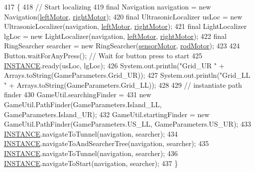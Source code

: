 \begin{DoxyCode}
417                                                   \{
418     \textcolor{comment}{// Start localizing}
419     \textcolor{keyword}{final} Navigation navigation = \textcolor{keyword}{new} Navigation(\hyperlink{enumca_1_1mcgill_1_1ecse211_1_1project_1_1_game_a7c673571bf50fdb6917a9d7bb671e003}{leftMotor}, \hyperlink{enumca_1_1mcgill_1_1ecse211_1_1project_1_1_game_a7a05fcf37c4435c32270776a427ba0d2}{rightMotor});
420     \textcolor{keyword}{final} UltrasonicLocalizer usLoc = \textcolor{keyword}{new} UltrasonicLocalizer(navigation, 
      \hyperlink{enumca_1_1mcgill_1_1ecse211_1_1project_1_1_game_a7c673571bf50fdb6917a9d7bb671e003}{leftMotor}, \hyperlink{enumca_1_1mcgill_1_1ecse211_1_1project_1_1_game_a7a05fcf37c4435c32270776a427ba0d2}{rightMotor});
421     \textcolor{keyword}{final} LightLocalizer lgLoc = \textcolor{keyword}{new} LightLocalizer(navigation, \hyperlink{enumca_1_1mcgill_1_1ecse211_1_1project_1_1_game_a7c673571bf50fdb6917a9d7bb671e003}{leftMotor}, 
      \hyperlink{enumca_1_1mcgill_1_1ecse211_1_1project_1_1_game_a7a05fcf37c4435c32270776a427ba0d2}{rightMotor});
422     \textcolor{keyword}{final} RingSearcher searcher = \textcolor{keyword}{new} RingSearcher(\hyperlink{enumca_1_1mcgill_1_1ecse211_1_1project_1_1_game_aa94b85dc88de85d959677bd6c0f98989}{sensorMotor}, 
      \hyperlink{enumca_1_1mcgill_1_1ecse211_1_1project_1_1_game_abc070af2fa5a5cda6d81977b35aacfb4}{rodMotor});
423 
424     Button.waitForAnyPress(); \textcolor{comment}{// Wait for button press to start}
425     \hyperlink{enumca_1_1mcgill_1_1ecse211_1_1project_1_1_game_a6584b6534b14ba43dc1444084a925a20}{INSTANCE}.ready(usLoc, lgLoc);
426     System.out.println(\textcolor{stringliteral}{"Grid\_UR "} + Arrays.toString(GameParameters.Grid\_UR));
427     System.out.println(\textcolor{stringliteral}{"Grid\_LL "} + Arrays.toString(GameParameters.Grid\_LL));
428 
429     \textcolor{comment}{// instantiate path finder}
430     GameUtil.searchingFinder =
431         \textcolor{keyword}{new} GameUtil.PathFinder(GameParameters.Island\_LL, GameParameters.Island\_UR);
432     GameUtil.startingFinder = \textcolor{keyword}{new} GameUtil.PathFinder(GameParameters.US\_LL, GameParameters.US\_UR);
433     \hyperlink{enumca_1_1mcgill_1_1ecse211_1_1project_1_1_game_a6584b6534b14ba43dc1444084a925a20}{INSTANCE}.navigateToTunnel(navigation, searcher);
434     \hyperlink{enumca_1_1mcgill_1_1ecse211_1_1project_1_1_game_a6584b6534b14ba43dc1444084a925a20}{INSTANCE}.navigateToAndSearcherTree(navigation, searcher);
435     \hyperlink{enumca_1_1mcgill_1_1ecse211_1_1project_1_1_game_a6584b6534b14ba43dc1444084a925a20}{INSTANCE}.navigateToTunnel(navigation, searcher);
436     \hyperlink{enumca_1_1mcgill_1_1ecse211_1_1project_1_1_game_a6584b6534b14ba43dc1444084a925a20}{INSTANCE}.navigateToStart(navigation, searcher);
437   \}
\end{DoxyCode}


